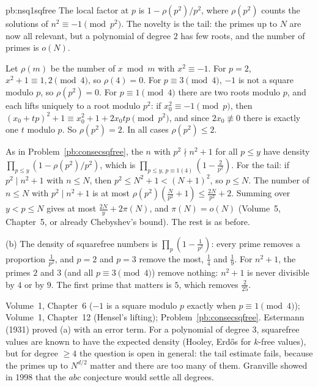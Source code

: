 \begin{solution}{pb:nsq1sqfree}
\idea The local factor at $p$ is $1-\rho(p^2)/p^2$, where $\rho(p^2)$ counts the solutions of $n^2\equiv-1\pmod{p^2}$. The novelty
is the tail: the primes up to $N$ are now all relevant, but a polynomial of degree $2$ has few roots, and the number of primes
is $o(N)$.

\writeup Let $\rho(m)$ be the number of $x\bmod m$ with $x^2\equiv-1$. For $p=2$, $x^2+1\equiv1,2\pmod4$, so $\rho(4)=0$. For $p\equiv3\pmod4$,
$-1$ is not a square modulo $p$, so $\rho(p^2)=0$. For $p\equiv1\pmod4$ there are two roots modulo $p$, and each lifts uniquely to
a root modulo $p^2$: if $x_0^2\equiv-1\pmod p$, then $(x_0+tp)^2+1\equiv x_0^2+1+2x_0tp\pmod{p^2}$, and since $2x_0\not\equiv0$ there is
exactly one $t$ modulo $p$. So $\rho(p^2)=2$. In all cases $\rho(p^2)\le2$.

As in Problem~\ref{pb:consecsqfree}, the $n$ with $p^2\nmid n^2+1$ for all $p\le y$ have density $\prod_{p\le y}(1-\rho(p^2)/p^2)$, which is
$\prod_{p\le y,\,p\equiv1(4)}(1-\frac2{p^2})$. For the tail: if $p^2\mid n^2+1$ with $n\le N$, then $p^2\le N^2+1<(N+1)^2$, so $p\le N$. The
number of $n\le N$ with $p^2\mid n^2+1$ is at most $\rho(p^2)(\frac N{p^2}+1)\le\frac{2N}{p^2}+2$. Summing over $y<p\le N$ gives at most
$\frac{2N}y+2\pi(N)$, and $\pi(N)=o(N)$ (Volume~5, Chapter~5, or already Chebyshev's bound). The rest is as before.

(b) The density of squarefree numbers is $\prod_p(1-\frac1{p^2})$: every prime removes a proportion $\frac1{p^2}$, and $p=2$ and $p=3$
remove the most, $\frac14$ and $\frac19$. For $n^2+1$, the primes $2$ and $3$ (and all $p\equiv3\pmod4$) remove nothing: $n^2+1$ is never
divisible by $4$ or by $9$. The first prime that matters is $5$, which removes $\frac2{25}$.

\tools Volume~1, Chapter~6 ($-1$ is a square modulo $p$ exactly when $p\equiv1\pmod4$); Volume~1, Chapter~12 (Hensel's lifting);
Problem~\ref{pb:consecsqfree}.
\leads Estermann (1931) proved (a) with an error term. For a polynomial of degree $3$, squarefree values are known to have the
expected density (Hooley, Erdős for $k$-free values), but for degree $\ge4$ the question is open in general: the tail estimate
fails, because the primes up to $N^{d/2}$ matter and there are too many of them. Granville showed in 1998 that the $abc$
conjecture would settle all degrees.
\end{solution}

